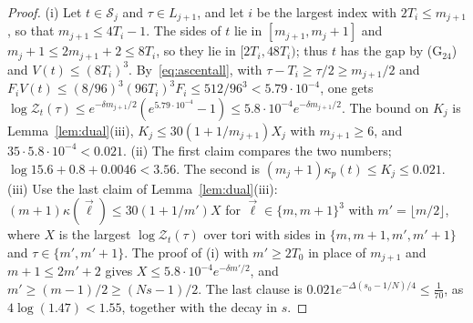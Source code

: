 \begin{proof}
(i) Let $t\in\mathcal S_j$ and $\tau\in L_{j+1}$, and let $i$ be the largest
index with $2T_i\le m_{j+1}$, so that $m_{j+1}\le4T_i-1$. The sides of $t$
lie in $[m_{j+1},m_j+1]$ and $m_j+1\le2m_{j+1}+2\le8T_i$, so they lie in
$[2T_i,48T_i)$; thus $t$ has the gap by (G$_{24}$) and $V(t)\le(8T_i)^3$.
By~\eqref{eq:ascentall}, with $\tau-T_i\ge\tau/2\ge m_{j+1}/2$ and
$F_iV(t)\le(8/96)^3(96T_i)^3F_i\le512/96^3<5.79\cdot10^{-4}$, one gets
$\log\mathcal Z_t(\tau)\le e^{-\delta m_{j+1}/2}(e^{5.79\cdot10^{-4}}-1)\le
5.8\cdot10^{-4}e^{-\delta m_{j+1}/2}$. The bound on $K_j$ is
Lemma~\ref{lem:dual}(iii), $K_j\le30(1+1/m_{j+1})X_j$ with $m_{j+1}\ge6$,
and $35\cdot5.8\cdot10^{-4}<0.021$. (ii) The first claim compares the two
numbers; $\log15.6+0.8+0.0046<3.56$. The second is $(m_j+1)\kappa_p(t)\le
K_j\le0.021$. (iii) Use the last claim of Lemma~\ref{lem:dual}(iii):
$(m+1)\kappa(\vec\ell)\le30(1+1/m')X$ for $\vec\ell\in\{m,m+1\}^3$ with $m'=
\lfloor m/2\rfloor$, where $X$ is the largest $\log\mathcal Z_t(\tau)$ over
tori with sides in $\{m,m+1,m',m'+1\}$ and $\tau\in\{m',m'+1\}$. The proof
of (i) with $m'\ge2T_0$ in place of $m_{j+1}$ and $m+1\le2m'+2$ gives $X\le
5.8\cdot10^{-4}e^{-\delta m'/2}$, and $m'\ge(m-1)/2\ge(Ns-1)/2$. The last
clause is $0.021e^{-\Delta(s_0-1/N)/4}\le\frac1{70}$, as $4\log(1.47)<1.55$,
together with the decay in $s$.
\end{proof}

